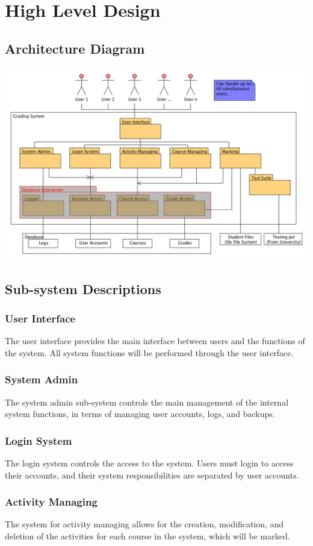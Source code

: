 \documentclass{article}
\begin{document}
\section{High Level Design}
\subsection{Architecture Diagram}
\centerline{\includegraphics[scale=0.55]{../images/architectureDiagram}}

\subsection{Sub-system Descriptions}
\subsubsection{User Interface}
The user interface provides the main interface between users and the functions
of the system. All system functions will be performed through the user interface.
\subsubsection{System Admin}
The system admin sub-system controls the main management of the internal
system functions, in terms of managing user accounts, logs, and backups.
\subsubsection{Login System}
The login system controls the access to the system. Users must login to access 
their accounts, and their system responsibilities are separated by user accounts.
\subsubsection{Activity Managing}
The system for activity managing allows for the creation, modification, and deletion
of the activities for each course in the system, which will be marked.
\end{document}
